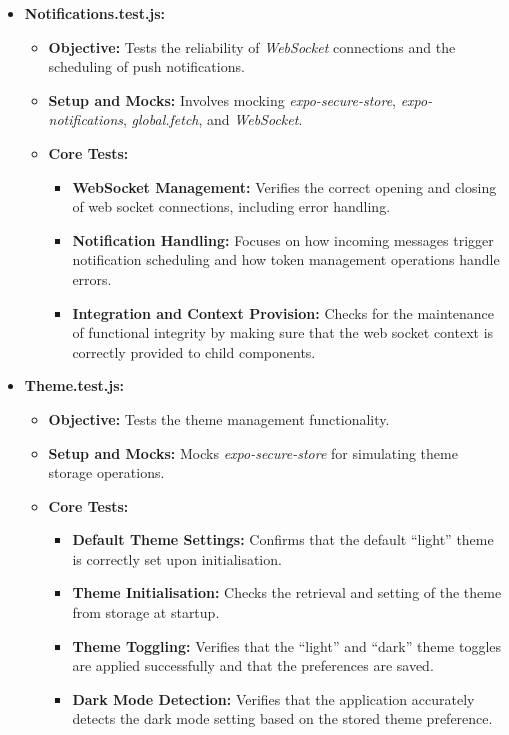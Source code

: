 \begin{itemize}
    \item \textbf{Notifications.test.js:}
    \begin{itemize}
        \item \textbf{Objective:} Tests the reliability of \textit{WebSocket} connections and the scheduling of push notifications.
        \item \textbf{Setup and Mocks:} Involves mocking \textit{expo-secure-store}, \textit{expo-notifications}, \textit{global.fetch}, and \textit{WebSocket}.
        \item \textbf{Core Tests:}
        \begin{itemize}
            \item \textbf{WebSocket Management:} Verifies the correct opening and closing of web socket connections, including error handling.
            \item \textbf{Notification Handling:} Focuses on how incoming messages trigger notification scheduling and how token management operations handle errors.
            \item \textbf{Integration and Context Provision:} Checks for the maintenance of functional integrity by making sure that the web socket context is correctly provided to child components.
        \end{itemize}
    \end{itemize}

    \item \textbf{Theme.test.js:}
    \begin{itemize}
        \item \textbf{Objective:} Tests the theme management functionality.
        \item \textbf{Setup and Mocks:} Mocks \textit{expo-secure-store} for simulating theme storage operations.
        \item \textbf{Core Tests:}
        \begin{itemize}
            \item \textbf{Default Theme Settings:} Confirms that the default ``light'' theme is correctly set upon initialisation.
            \item \textbf{Theme Initialisation:} Checks the retrieval and setting of the theme from storage at startup.
            \item \textbf{Theme Toggling:} Verifies that the ``light'' and ``dark'' theme toggles are applied successfully and that the preferences are saved.
            \item \textbf{Dark Mode Detection:} Verifies that the application accurately detects the dark mode setting based on the stored theme preference.
        \end{itemize}
    \end{itemize}
\end{itemize}

